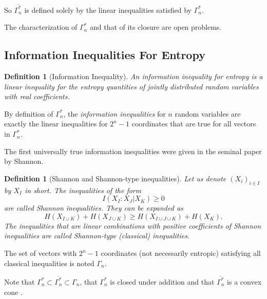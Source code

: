 \documentclass[11pt, a4paper]{kybernetika}
\newtheorem{definition}[theorem]{Definition}
\begin{document}
	So $\overline{\Gamma_n^*}$ is defined solely by the linear inequalities satisfied by $\Gamma_n^*$.
	
	The characterization of $\Gamma_n^*$ and that of its closure are open problems.
	
	\subsection{Information Inequalities For Entropy}\label{s:inf-ineq}
	
	\begin{definition}[Information Inequality]
		An \emph{information inequality} for entropy is a linear inequality for the entropy quantities of jointly distributed random variables with real coefficients.
	\end{definition}
	By definition of $\Gamma_n^*$, the \emph{information inequalities} for $n$ random variables are exactly the linear inequalities for $2^n-1$ coordinates that are true for all vectors in $\Gamma_n^*$.
	
	The first universally true information inequalities were given in the seminal paper \cite{shannon1948mathematical} by Shannon.
	
	\begin{definition}[Shannon and Shannon-type inequalities]\label{def:Shannon-ineq}
		Let us denote $(X_i)_{i\in I}$ by $X_I$ in short. The inequalities of the form $$I(X_I:X_J|X_K)\ge0$$ are called \emph{Shannon inequalities}. They can be expanded as
		$$H(X_{I\cup K}) + H(X_{J\cup K}) \ge H(X_{I\cup J\cup K}) + H(X_{K}).$$
		The inequalities that are linear combinations with positive coefficients of Shannon inequalities are called \emph{Shannon-type (classical) inequalities}. 
	\end{definition}
	
	The set of vectors with $2^n-1$ coordinates (not necessarily entropic) satisfying all classical inequalities is noted $\Gamma_n$.
	
	Note that $\Gamma_n^*\subset\overline{\Gamma_n^*}\subset\Gamma_n$, that $\Gamma_n^*$ is closed under addition and that $\overline{\Gamma_n^*}$ is a convex cone \cite{zhang1997non}.
	
\end{document}
